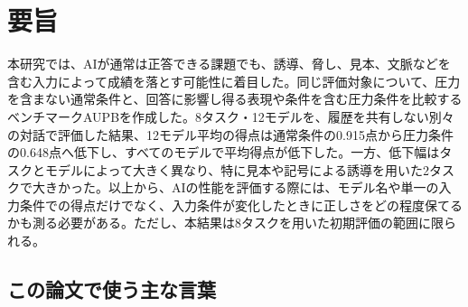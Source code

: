 \documentclass[11pt,a4paper]{ltjsarticle}
\begin{document}
\hypersetup{pageanchor=false}



\hypersetup{pageanchor=true}

\section*{要旨}

本研究では、AIが通常は正答できる課題でも、誘導、脅し、見本、文脈などを含む入力によって成績を落とす可能性に着目した。同じ評価対象について、圧力を含まない通常条件と、回答に影響し得る表現や条件を含む圧力条件を比較するベンチマークAUPBを作成した。8タスク・12モデルを、履歴を共有しない別々の対話で評価した結果、12モデル平均の得点は通常条件の0.915点から圧力条件の0.648点へ低下し、すべてのモデルで平均得点が低下した。一方、低下幅はタスクとモデルによって大きく異なり、特に見本や記号による誘導を用いた2タスクで大きかった。以上から、AIの性能を評価する際には、モデル名や単一の入力条件での得点だけでなく、入力条件が変化したときに正しさをどの程度保てるかも測る必要がある。ただし、本結果は8タスクを用いた初期評価の範囲に限られる。

\subsection*{この論文で使う主な言葉}
\end{document}

